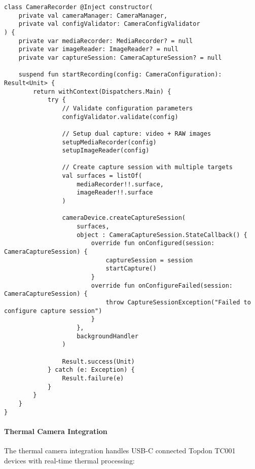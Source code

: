 \documentclass[12pt,a4paper]{article}
\begin{document}
\begin{verbatim}
class CameraRecorder @Inject constructor(
    private val cameraManager: CameraManager,
    private val configValidator: CameraConfigValidator
) {
    private var mediaRecorder: MediaRecorder? = null
    private var imageReader: ImageReader? = null
    private var captureSession: CameraCaptureSession? = null

    suspend fun startRecording(config: CameraConfiguration): Result<Unit> {
        return withContext(Dispatchers.Main) {
            try {
                // Validate configuration parameters
                configValidator.validate(config)

                // Setup dual capture: video + RAW images
                setupMediaRecorder(config)
                setupImageReader(config)

                // Create capture session with multiple targets
                val surfaces = listOf(
                    mediaRecorder!!.surface,
                    imageReader!!.surface
                )

                cameraDevice.createCaptureSession(
                    surfaces,
                    object : CameraCaptureSession.StateCallback() {
                        override fun onConfigured(session: CameraCaptureSession) {
                            captureSession = session
                            startCapture()
                        }
                        override fun onConfigureFailed(session: CameraCaptureSession) {
                            throw CaptureSessionException("Failed to configure capture session")
                        }
                    },
                    backgroundHandler
                )

                Result.success(Unit)
            } catch (e: Exception) {
                Result.failure(e)
            }
        }
    }
}
\end{verbatim}

\paragraph{Thermal Camera Integration}

The thermal camera integration handles USB-C connected Topdon TC001 devices with real-time thermal processing:
\end{document}
